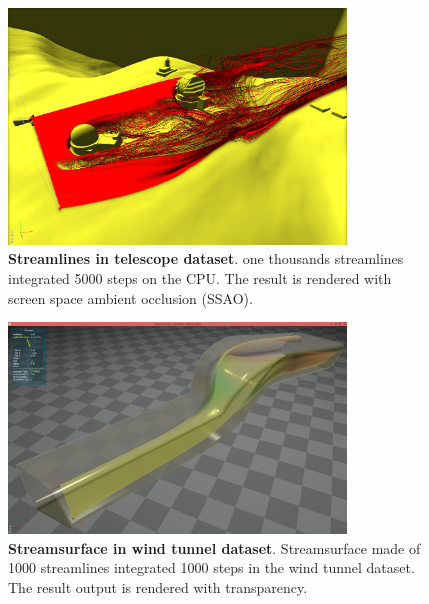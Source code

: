 \documentclass[]{article}
\begin{document}
\begin{figure}[!ht]
	\centering
	\includegraphics[width=0.80\textwidth]{telescope}
	\caption[Streamlines in telescope dataset]{\textbf{Streamlines in telescope dataset}. one thousands streamlines integrated 5000 steps on the CPU. The result is rendered with screen space ambient occlusion (SSAO). }
	\label{fig:telescope_result}
\end{figure}


\begin{figure}[!ht]
	\centering
	\includegraphics[width=0.80\textwidth]{othmer.png}
	\caption[Streamsurface in wind tunnel dataset]{\textbf{Streamsurface in wind tunnel dataset}. Streamsurface made of 1000 streamlines integrated 1000 steps in the wind tunnel dataset. The result output is rendered with transparency.}
	\label{fig:othmer_result}
\end{figure}
\end{document}
